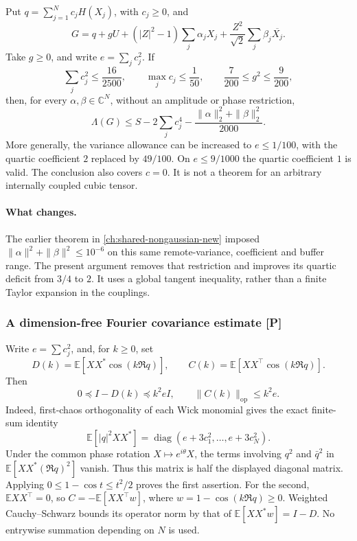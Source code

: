 \begin{theorem}
\label{thm:buffered-review-anyn}
Put \(q=\sum_{j=1}^N c_jH(X_j)\), with \(c_j\ge0\), and
\[
 G=q+gU+(|Z|^2-1)\sum_j\alpha_jX_j+
       \frac{Z^2}{\sqrt2}\sum_j\beta_j\overline{X_j}.
\]
Take \(g\ge0\), and write \(e=\sum_jc_j^2\).
If
\[
 \sum_jc_j^2\le\frac{16}{2500},\qquad
 \max_j c_j\le\frac1{50},\qquad
 \frac7{200}\le g^2\le\frac9{200},
\]
then, for every \(\alpha,\beta\in\mathbb C^N\), without an amplitude
or phase restriction,
\[
 \boxed{\quad
 \Lambda(G)\le S-2\sum_jc_j^4-
                  \frac{\|\alpha\|_2^2+\|\beta\|_2^2}{2000}.
 \quad}
\]
More generally, the variance allowance can be increased to \(e\le1/100\),
with the quartic coefficient \(2\) replaced by \(49/100\).
On \(e\le9/1000\) the quartic coefficient \(1\) is valid.
The conclusion also covers \(c=0\). It is not a theorem for an arbitrary
internally coupled cubic tensor.
\end{theorem}

\paragraph{What changes.}
The earlier theorem in \autoref{ch:shared-nongaussian-new} imposed
\(\|\alpha\|^2+\|\beta\|^2\le10^{-6}\) on this same
remote-variance, coefficient and buffer range.  The present argument
removes that restriction and improves its quartic deficit from
\(3/4\) to \(2\).  It uses a global tangent inequality, rather than a
finite Taylor expansion in the couplings.

\subsubsection{A dimension-free Fourier covariance estimate \textbf{[P]}}
Write \(e=\sum c_j^2\), and, for \(k\ge0\), set
\[
 D(k)=\mathbb E[XX^*\cos(k\Re q)],\qquad
 C(k)=\mathbb E[XX^\top\cos(k\Re q)].
\]
Then
\begin{equation}
 0\preceq I-D(k)\preceq k^2eI,\qquad
 \|C(k)\|_{\mathrm{op}}\le k^2e.
 \label{eq:buffered-review-covariance}
\end{equation}
Indeed, first-chaos orthogonality of each Wick monomial gives the
exact finite-sum identity
\[
 \mathbb E[|q|^2XX^*]
       =\operatorname{diag}(e+3c_1^2,\ldots,e+3c_N^2).
\]
Under the common phase rotation \(X\mapsto e^{i\theta}X\), the
terms involving \(q^2\) and \(\bar q^2\) in
\(\mathbb E[XX^*(\Re q)^2]\) vanish. Thus this matrix is half
the displayed diagonal matrix. Applying
\(0\le1-\cos t\le t^2/2\) proves the first assertion.
For the second, \(\mathbb E XX^\top=0\), so \(C=-\mathbb E[XX^\top w]\),
where \(w=1-\cos(k\Re q)\ge0\).
Weighted Cauchy--Schwarz bounds its operator norm by that of
\(\mathbb E[XX^*w]=I-D\).  No entrywise summation depending on \(N\)
is used.

